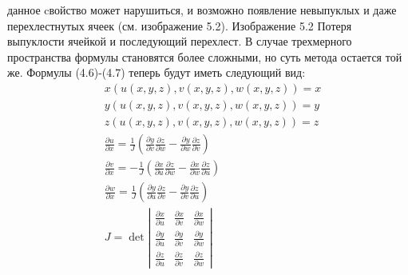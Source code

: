 \documentclass[a4paper,14pt,russian]{extreport}
\renewcommand{\_}{\kern-1.5pt\textunderscore\kern-1.5pt}
\begin{document}
данное cвойство может нарушиться, и возможно появление невыпуклых и даже перехлестнутых ячеек (см. изображение 5.2).
Изображение 5.2
Потеря выпуклости ячейкой и последующий перехлест.
В случае трехмерного пространства формулы становятся более сложными, но суть метода остается той же. Формулы (4.6)-(4.7) теперь будут иметь следующий вид:
\begin{equation}
\begin{aligned}
& x(u(x, y, z), v(x, y, z), w(x, y, z)) = x \\
& y(u(x, y, z), v(x, y, z), w(x, y, z)) = y \\
& z(u(x, y, z), v(x, y, z), w(x, y, z)) = z \\
& \frac{\partial u}{\partial x} = \frac{1}{J} \left( \frac{\partial y}{\partial v} \frac{\partial z}{\partial w} - \frac{\partial y}{\partial w} \frac{\partial z}{\partial v} \right) \\
& \frac{\partial v}{\partial x} = -\frac{1}{J} \left( \frac{\partial x}{\partial u} \frac{\partial z}{\partial w} - \frac{\partial x}{\partial w} \frac{\partial z}{\partial u} \right) \\
& \frac{\partial w}{\partial x} = \frac{1}{J} \left( \frac{\partial y}{\partial u} \frac{\partial z}{\partial v} - \frac{\partial y}{\partial v} \frac{\partial z}{\partial u} \right) \\
& J = \operatorname{det} \left| \begin{array}{ccc}
\frac{\partial x}{\partial u} & \frac{\partial x}{\partial v} & \frac{\partial x}{\partial w} \\
\frac{\partial y}{\partial u} & \frac{\partial y}{\partial v} & \frac{\partial y}{\partial w} \\
\frac{\partial z}{\partial u} & \frac{\partial z}{\partial v} & \frac{\partial z}{\partial w}
\end{array} \right|
\end{aligned}
\end{equation}
\end{document}
